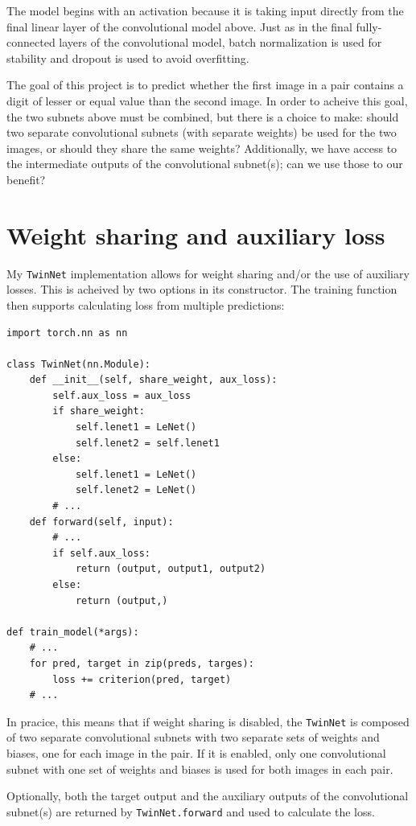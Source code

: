 \documentclass[prl, article, twocolumn]{revtex4-1}
\begin{document}
The model begins with an activation because it is taking input directly from the final linear layer of the convolutional model above. Just as in the final fully-connected layers of the convolutional model, batch normalization is used for stability and dropout is used to avoid overfitting.

The goal of this project is to predict whether the first image in a pair contains a digit of lesser or equal value than the second image. In order to acheive this goal, the two subnets above must be combined, but there is a choice to make: should two separate convolutional subnets (with separate weights) be used for the two images, or should they share the same weights? Additionally, we have access to the intermediate outputs of the convolutional subnet(s); can we use those to our benefit? 

\section{Weight sharing and auxiliary loss}
My \texttt{TwinNet} implementation allows for weight sharing and/or the use of auxiliary losses. This is acheived by two options in its constructor. The training function then supports calculating loss from multiple predictions:

\begin{verbatim}
import torch.nn as nn

class TwinNet(nn.Module):
    def __init__(self, share_weight, aux_loss):
        self.aux_loss = aux_loss
        if share_weight:
            self.lenet1 = LeNet()
            self.lenet2 = self.lenet1
        else:
            self.lenet1 = LeNet()
            self.lenet2 = LeNet()
        # ...
    def forward(self, input):
        # ...
        if self.aux_loss:
            return (output, output1, output2)
        else:
            return (output,)

def train_model(*args):
    # ...
    for pred, target in zip(preds, targes):
        loss += criterion(pred, target)
    # ...
\end{verbatim}

In pracice, this means that if weight sharing is disabled, the \texttt{TwinNet} is composed of two separate convolutional subnets with two separate sets of weights and biases, one for each image in the pair. If it is enabled, only one convolutional subnet with one set of weights and biases is used for both images in each pair.

Optionally, both the target output and the auxiliary outputs of the convolutional subnet(s) are returned by \texttt{TwinNet.forward} and used to calculate the loss.
\end{document}

